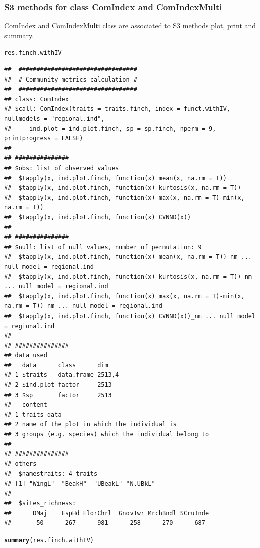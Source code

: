 \documentclass[12pt]{article}\usepackage[]{graphicx}\usepackage[]{color}
\makeatletter
\newcommand{\hlstd}[1]{\textcolor[rgb]{0.345,0.345,0.345}{#1}}%
\newcommand{\hlkwd}[1]{\textcolor[rgb]{0.737,0.353,0.396}{\textbf{#1}}}%
\newenvironment{kframe}{%
 \def\at@end@of@kframe{}%
 \ifinner\ifhmode%
  \def\at@end@of@kframe{\end{minipage}}%
  \begin{minipage}{\columnwidth}%
 \fi\fi%
 \def\FrameCommand##1{\hskip\@totalleftmargin \hskip-\fboxsep
 \colorbox{shadecolor}{##1}\hskip-\fboxsep
     \hskip-\linewidth \hskip-\@totalleftmargin \hskip\columnwidth}%
 \MakeFramed {\advance\hsize-\width
   \@totalleftmargin\z@ \linewidth\hsize
   \@setminipage}}%
 {\par\unskip\endMakeFramed%
 \at@end@of@kframe}
\newenvironment{knitrout}{}{} %
\makeatother
\begin{document}
\subsubsection{S3 methods for class ComIndex and ComIndexMulti}
ComIndex and ComIndexMulti class are associated to S3 methods plot, print and summary.

\begin{knitrout}
\color{fgcolor}\begin{kframe}
\begin{alltt}
\hlstd{res.finch.withIV}
\end{alltt}
\begin{verbatim}
## 	#################################
## 	# Community metrics calculation #
## 	#################################
## class: ComIndex
## $call: ComIndex(traits = traits.finch, index = funct.withIV, nullmodels = "regional.ind", 
##     ind.plot = ind.plot.finch, sp = sp.finch, nperm = 9, printprogress = FALSE)
## 
## ###############
## $obs: list of observed values
## 	$tapply(x, ind.plot.finch, function(x) mean(x, na.rm = T))
## 	$tapply(x, ind.plot.finch, function(x) kurtosis(x, na.rm = T))
## 	$tapply(x, ind.plot.finch, function(x) max(x, na.rm = T)-min(x, na.rm = T))
## 	$tapply(x, ind.plot.finch, function(x) CVNND(x))
## 
## ###############
## $null: list of null values, number of permutation: 9 
## 	$tapply(x, ind.plot.finch, function(x) mean(x, na.rm = T))_nm ... null model = regional.ind
## 	$tapply(x, ind.plot.finch, function(x) kurtosis(x, na.rm = T))_nm ... null model = regional.ind
## 	$tapply(x, ind.plot.finch, function(x) max(x, na.rm = T)-min(x, na.rm = T))_nm ... null model = regional.ind
## 	$tapply(x, ind.plot.finch, function(x) CVNND(x))_nm ... null model = regional.ind
## 
## ###############
## data used
##   data      class      dim   
## 1 $traits   data.frame 2513,4
## 2 $ind.plot factor     2513  
## 3 $sp       factor     2513  
##   content                                             
## 1 traits data                                         
## 2 name of the plot in which the individual is         
## 3 groups (e.g. species) which the individual belong to
## 
## ###############
## others
## 	$namestraits: 4 traits
## [1] "WingL"  "BeakH"  "UBeakL" "N.UBkL"
## 
## 	$sites_richness:
## 	    DMaj    EspHd FlorChrl  GnovTwr MrchBndl SCruInde 
##       50      267      981      258      270      687
\end{verbatim}
\begin{alltt}
\hlkwd{summary}\hlstd{(res.finch.withIV)}

\end{alltt}
\end{kframe}
\end{knitrout}
\end{document}
